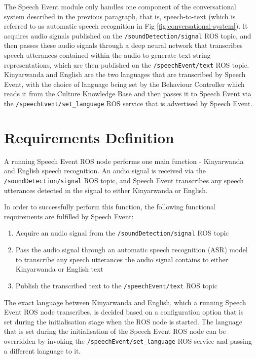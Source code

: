 \documentclass{CSSRforAfrica}
\begin{document}
The Speech Event module only handles one component of the conversational system described in the previous paragraph, that is, speech-to-text (which is referred to as automatic speech recognition in Fig \ref{fig:conversational-system}). It acquires audio signals published on the \texttt{/soundDetection/signal} ROS topic, and then passes these audio signals through a deep neural network that transcribes speech utterances contained within the audio to generate text string representations, which are then published on the \texttt{/speechEvent/text} ROS topic. Kinyarwanda and English are the two languages that are transcribed by Speech Event, with the choice of language being set by the Behaviour Controller which reads it from the Culture Knowledge Base and then passes it to Speech Event via the \texttt{/speechEvent/set\_language} ROS service that is advertised by Speech Event.


\newpage
\section{Requirements Definition}
A running Speech Event ROS node performs one main function - Kinyarwanda and English speech recognition. An audio signal is received via the \texttt{/soundDetection/signal} ROS topic, and Speech Event transcribes any speech utterances detected in the signal to either Kinyarwanda or English.

In order to successfully perform this function, the following functional requirements are fulfilled by Speech Event:

\begin{enumerate}
    \item Acquire an audio signal from the \texttt{/soundDetection/signal} ROS topic
    \item Pass the audio signal through an automatic speech recognition (ASR) model to transcribe any speech utterances the audio signal contains to either Kinyarwanda or English text
    \item Publish the transcribed text to the \texttt{/speechEvent/text} ROS topic
\end{enumerate}

The exact language between Kinyarwanda and English, which a running Speech Event ROS node transcribes, is decided based on a configuration option that is set during the initialisation stage when the ROS node is started. The language that is set during the initialisation of the Speech Event ROS node can be overridden by invoking the \texttt{/speechEvent/set\_language} ROS service and passing a different language to it.
\end{document}
